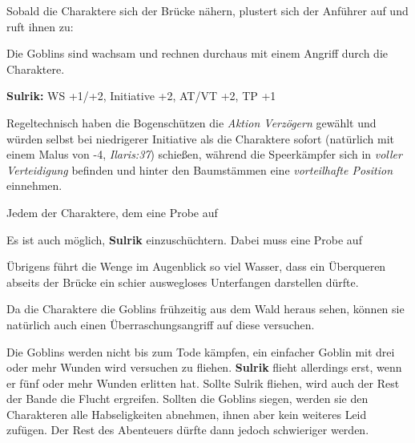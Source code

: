 Sobald die Charaktere sich der Brücke nähern, plustert sich der Anführer auf und ruft ihnen zu:

Die Goblins sind wachsam und rechnen durchaus mit einem Angriff durch die Charaktere.

\kreaturgoblin
\textbf{Sulrik:} WS +1/+2, Initiative +2, AT/VT +2, TP +1



Regeltechnisch haben die Bogenschützen die \emph{Aktion Verzögern} gewählt und würden selbst bei niedrigerer Initiative als die Charaktere sofort (natürlich mit einem Malus von -4, \textit{Ilaris:37}) schießen, während die Speerkämpfer sich in \textit{voller Verteidigung} befinden und hinter den Baumstämmen eine \emph{vorteilhafte Position} einnehmen.


Jedem der Charaktere, dem eine Probe auf 


Es ist auch möglich, \textbf{Sulrik} einzuschüchtern. Dabei muss eine Probe auf


Übrigens führt die Wenge im Augenblick so viel Wasser, dass ein Überqueren abseits der Brücke ein schier auswegloses Unterfangen darstellen dürfte. 

Da die Charaktere die Goblins frühzeitig aus dem Wald heraus sehen, können sie natürlich auch einen Überraschungsangriff auf diese versuchen.



Die Goblins werden nicht bis zum Tode kämpfen, ein einfacher Goblin mit drei oder mehr Wunden wird versuchen zu fliehen.
\textbf{Sulrik} flieht  allerdings erst, wenn er fünf oder mehr Wunden erlitten hat.
Sollte Sulrik fliehen, wird auch der Rest der Bande die Flucht ergreifen.
Sollten die Goblins siegen, werden sie den Charakteren alle Habseligkeiten abnehmen, ihnen aber kein weiteres Leid zufügen.
Der Rest des Abenteuers dürfte dann jedoch schwieriger werden. 
%
%
%

